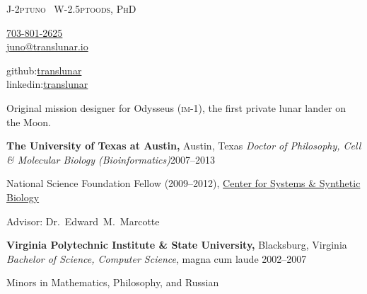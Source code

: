 \documentclass[12pt,letterpaper]{article}
\makeatletter
\def\myemail{juno@translunar.io}
\def\myphone{703-801-2625}
\newenvironment{itemize*}%
{\begin{itemize}%
  \setlength{\itemsep}{0pt}}%
{\end{itemize}}
\newcommand{\mhead}[1]{\leavevmode\marginpar{\sffamily\footnotesize #1}}
\newcommand{\rdate}[1]{{\hfill #1}}
\makeatother
\begin{document}
\flushbottom
\pagestyle{fancy} \setlength\headwidth{6.5in}
 \cfoot{}
\thispagestyle{empty}
\begin{adjustwidth}{-1in}{}
{\Huge
  {\textsc{%
    {%
    J}\kern-2ptuno~%
    {%
    W}\kern-2.5ptoods, PhD}
  }
  }
%
{
  \begin{minipage}[b]{1.3in}
    \flushleft \footnotesize   
    \href{tel:\myphone}{\myphone} \\ %
    \href{mailto:\myemail}{\myemail}
  \end{minipage}
  \hfill
  \begin{minipage}[b]{1.3in}
    \flushright \footnotesize 
    github:\href{https://github.com/translunar}{translunar} \\
    linkedin:\href{https://www.linkedin.com/in/translunar}{translunar}
  \end{minipage}
}\par
\hrulefill

\centering\small Original mission designer for Odysseus (\textsc{im}-1), the first private lunar lander on the Moon.
\vskip-6pt
\hrulefill
\end{adjustwidth}
\reversemarginpar 
\setlength\marginparwidth{0.85in}
\smallskip

\mhead{Education}%
\textbf{The University of Texas at Austin,} Austin, Texas \newline
\emph{Doctor of Philosophy, Cell \& Molecular Biology (Bioinformatics)}\rdate{2007--2013}
\begin{itemize*}
  \item National Science Foundation Fellow (2009--2012), \href{http://cssb.utexas.edu/}{Center for Systems \& Synthetic Biology} %
  \item Advisor: Dr.~Edward~M.~Marcotte
\end{itemize*}

\medskip
\textbf{Virginia Polytechnic Institute \& State University,} Blacksburg, Virginia \newline
\emph{Bachelor of Science, Computer Science}, magna cum laude \rdate{2002--2007}
\begin{itemize*}
  \item Minors in Mathematics, Philosophy, and Russian
\end{itemize*}
\end{document}
